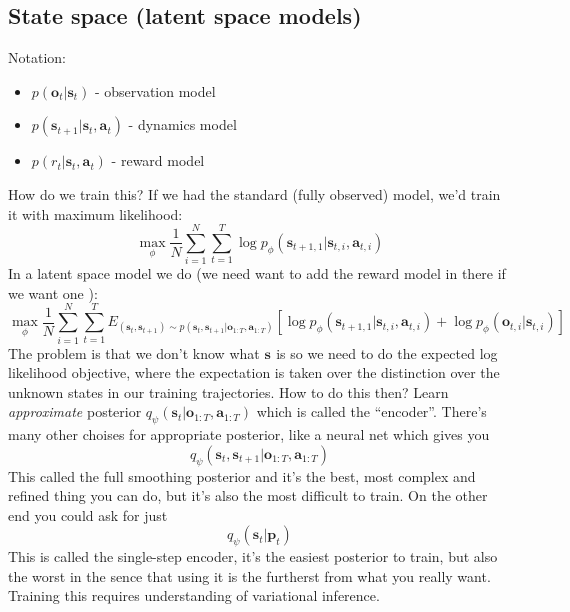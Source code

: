 \documentclass{report}
\begin{document}
\subsection{State space (latent space models)}
Notation: 
\begin{itemize}
		\item $p(\bm{o}_{t}|\bm{s}_{t})$ - observation model
		\item $p(\bm{s}_{t+1}|\bm{s}_{t}, \bm{a}_{t})$ - dynamics model
		\item $p(r_t|\bm{s}_{t}, \bm{a}_{t})$ - reward model
\end{itemize}
How do we train this? 
If we had the standard (fully observed) model, we'd train it with maximum likelihood:
\begin{equation}
		\max_\phi \frac{1}{N} \sum_{i=1}^{N} \sum_{t=1}^{T} \log p_\phi ( \bm{s}_{t+1,1}| \bm{s}_{t,i}, \bm{a}_{t,i})
\end{equation}
In a latent space model we do (we need want to add the reward model in there if we want one ):
\begin{equation}
		\max_\phi \frac{1}{N} \sum_{i=1}^{N} \sum_{t=1}^{T} 
		E_{(\bm{s}_{t}, \bm{s}_{t+1}) \sim p(\bm{s}_{t}, \bm{s}_{t+1}|\bm{o}_{1:T}, \bm{a}_{1:T}) } \left[ \log p_\phi ( \bm{s}_{t+1,1}| \bm{s}_{t,i}, \bm{a}_{t,i}) 
		+ \log p_\phi (\bm{o}_{t,i}| \bm{s}_{t,i}) \right] 
\end{equation}
The problem is that we don't know what $\bm{s}_{}$ is so we need to do the expected log likelihood objective,
where the expectation is taken over the distinction over the unknown states in our training trajectories.
How to do this then?
Learn \textit{approximate} posterior $q_\psi (\bm{s}_{t}|\bm{o}_{1:T}, \bm{a}_{1:T})$ which is called the ``encoder''.
There's many other choises for appropriate posterior, like a neural net which gives you
\begin{equation}
		q_\psi (\bm{s}_{t}, \bm{s}_{t+1}|\bm{o}_{1:T}, \bm{a}_{1:T})
\end{equation}
This called the full smoothing posterior and it's the best, most complex and refined thing you can do, but it's also the most difficult to train.
On the other end you could ask for just
\begin{equation}
		q_\psi (\bm{s}_{t}| \bm{p}_{t})
\end{equation}
This is called the single-step encoder, it's the easiest posterior to train, but also the worst in the sence that using it is the furtherst from what you really want.
Training this requires understanding of variational inference.
\end{document}
